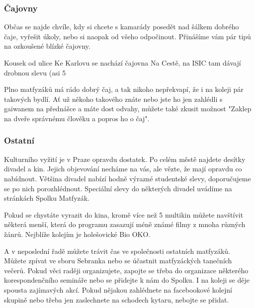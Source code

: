 \subsubsection{Čajovny}
Občas se najde chvíle, kdy si chcete s kamarády posedět nad šálkem dobrého čaje, vyřešit úkoly, nebo si naopak od všeho odpočinout. Přinášíme vám pár tipů na ozkoušené blízké čajovny.

Kousek od ulice Ke Karlovu se nachází čajovna Na Cestě, na ISIC tam dávají drobnou slevu (asi 5 %

Plno matfyzáků má rádo dobrý čaj, a tak nikoho nepřekvapí, že i na koleji pár takových bydlí. Ať už někoho takového znáte nebo jste ho jen zahlédli s gaiwanem na přednášce a máte dost odvahy, můžete také zkusit možnost "Zaklep na dveře správnému člověku a popros ho o čaj".


\subsubsection{Ostatní}
Kulturního vyžití je v Praze opravdu dostatek. Po celém městě najdete desítky divadel a kin. Jejich objevování necháme na vás, ale vězte, že mají opravdu co nabídnout. Většina divadel nabízí hodně výrazné studentské slevy, doporučujeme se po nich porozhlédnout. Speciální slevy do některých divadel uvádíme na stránkách Spolku Matfyzák.

Pokud se chystáte vyrazit do kina, kromě více než 5 multikin můžete navštívit některá menší, která do programu zasazují méně známé filmy z mnoha různých žánrů. Nejblíže kolejím je holešovické Bio OKO.

A v neposlední řadě můžete trávit čas ve společnosti ostatních matfyzáků. Můžete zpívat ve sboru Sebranka nebo se účastnit matfyzáckých tanečních večerů. Pokud věci raději organizujete, zapojte se třeba do organizace některého korespondenčního semináře nebo se přidejte k nám do Spolku. I na koleji se děje spousta zajímavých akcí. Pokud nějakou zahlédnete na facebookové kolejní skupině nebo třeba jen zaslechnete na schodech kytaru, nebojte se přidat.